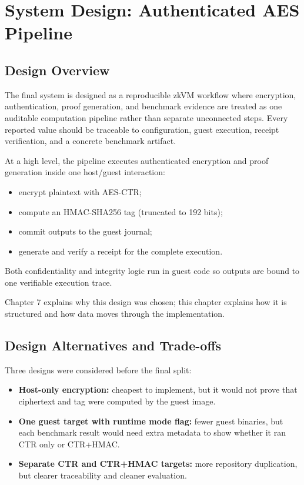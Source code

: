 \chapter{System Design: Authenticated AES Pipeline}

\section{Design Overview}

The final system is designed as a reproducible zkVM workflow where encryption,
authentication, proof generation, and benchmark evidence are treated as one
auditable computation pipeline rather than separate unconnected steps. Every
reported value should be traceable to configuration, guest execution, receipt
verification, and a concrete benchmark artifact.

At a high level, the pipeline executes authenticated encryption and proof
generation inside one host/guest interaction:

\begin{itemize}
\item encrypt plaintext with AES-CTR;
\item compute an HMAC-SHA256 tag (truncated to 192 bits);
\item commit outputs to the guest journal;
\item generate and verify a receipt for the complete execution.
\end{itemize}

Both confidentiality and integrity logic run in guest code so outputs are bound
to one verifiable execution trace.

Chapter 7 explains why this design was chosen; this chapter explains how it is
structured and how data moves through the implementation.

\section{Design Alternatives and Trade-offs}

Three designs were considered before the final split:

\begin{itemize}
\item \textbf{Host-only encryption:} cheapest to implement, but it would not prove
that ciphertext and tag were computed by the guest image.
\item \textbf{One guest target with runtime mode flag:} fewer guest binaries,
but each benchmark result would need extra metadata to show whether it ran CTR
only or CTR+HMAC.
\item \textbf{Separate CTR and CTR+HMAC targets:} more repository duplication, but
clearer traceability and cleaner evaluation.
\end{itemize}

